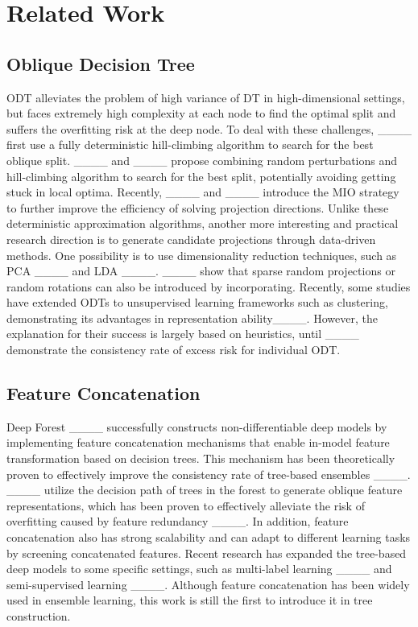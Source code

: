 \section{Related Work}
\label{sec:rlt}

\subsection{Oblique Decision Tree}
ODT alleviates the problem of high variance of DT in high-dimensional settings, but faces extremely high complexity at each node to find the optimal split and suffers the overfitting risk at the deep node. To deal with these challenges, ____ first use a fully deterministic hill-climbing algorithm to search for the best oblique split.
____ and ____ propose combining random perturbations and hill-climbing algorithm to search for the best split, potentially avoiding getting stuck in local optima. 
Recently, ____ and ____ introduce the MIO strategy to further improve the efficiency of solving projection directions.
Unlike these deterministic approximation algorithms, another more interesting and practical research direction is to generate candidate projections through data-driven methods.
One possibility is to use dimensionality reduction techniques, such as PCA ____ and LDA ____.
____ show that sparse random projections or random rotations can also be introduced by incorporating.
Recently, some studies have extended ODTs to unsupervised learning frameworks such as clustering, demonstrating its advantages in representation ability____.
However, the explanation for their success is largely based on heuristics, until ____ demonstrate the consistency rate of excess risk for individual ODT.

\subsection{Feature Concatenation}
Deep Forest ____ successfully constructs non-differentiable deep models by implementing feature concatenation mechanisms that enable in-model feature transformation based on decision trees. This mechanism has been theoretically proven to effectively improve the consistency rate of tree-based ensembles ____. ____ utilize the decision path of trees in the forest to generate oblique feature representations, which has been proven to effectively alleviate the risk of overfitting caused by feature redundancy ____.
In addition, feature concatenation also has strong scalability and can adapt to different learning tasks by screening concatenated features. Recent research has expanded the tree-based deep models to some specific settings, such as multi-label learning ____ and semi-supervised learning ____. 
Although feature concatenation has been widely used in ensemble learning, this work is still the first to introduce it in tree construction.